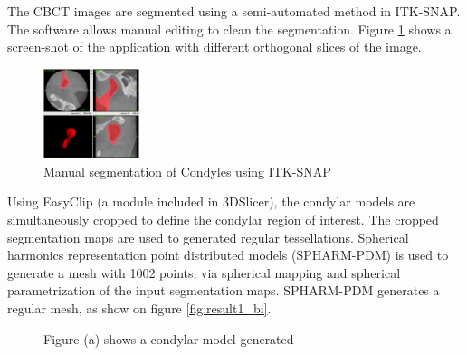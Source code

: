 \documentclass[]{spie}  %
\begin{document}
The CBCT images are segmented using a semi-automated method in ITK-SNAP\cite{py06nimg}. The software allows manual editing to clean the segmentation. Figure \ref{fig:itkSnapCondyle} shows a screen-shot of the application with different orthogonal slices
of the image.
\begin{figure}
\centering 
    \label{fig:itkSnapCondyle}
    \includegraphics[width=0.25\textwidth]{ITKSnapCondyles.png}
    \caption{Manual segmentation of Condyles using ITK-SNAP}
\end{figure} 
Using EasyClip (a module included in 3DSlicer), the condylar models are simultaneously cropped to define the condylar region of interest. The cropped segmentation maps are used to generated regular tessellations.
Spherical harmonics representation point distributed models (SPHARM-PDM)\cite{styner2006framework} is used to generate a mesh with 1002 points, via spherical mapping and spherical parametrization of the input segmentation maps. 
SPHARM-PDM generates a regular mesh, as show on figure \ref{fig:result1_bi}.
\begin{figure}
\centering 
    \caption{Figure (a) shows a condylar model generated }
    \label{fig:result_bi}
\end{figure} 
\end{document}
